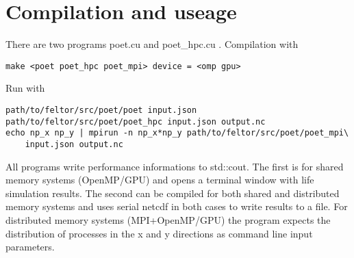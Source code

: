 \section{Compilation and useage}
There are two programs poet.cu and poet\_hpc.cu . Compilation with
\begin{verbatim}
make <poet poet_hpc poet_mpi> device = <omp gpu>
\end{verbatim}
Run with
\begin{verbatim}
path/to/feltor/src/poet/poet input.json
path/to/feltor/src/poet/poet_hpc input.json output.nc
echo np_x np_y | mpirun -n np_x*np_y path/to/feltor/src/poet/poet_mpi\
    input.json output.nc
\end{verbatim}
All programs write performance informations to std::cout.
The first is for shared memory systems (OpenMP/GPU) and opens a terminal window with life simulation results.
 The
second can be compiled for both shared and distributed memory systems and uses serial netcdf in both cases
to write results to a file.
For distributed
memory systems (MPI+OpenMP/GPU) the program expects the distribution of processes in the
x and y directions as command line input parameters.

